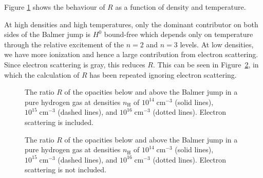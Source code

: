 \begin{problem}
Figure \ref{figure:problem-balmer-jump} shows the behaviour of $R$ as a function of density and temperature. 

At high densities and high temperatures, only the dominant contributor on both sides of the Balmer jump is $H^0$ bound-free which depends only on temperature through the relative excitement of the $n = 2$ and $n = 3$ levels. At low densities, we have more ionization and hence a large contribution from electron scattering. Since electron scattering is gray, this reduces $R$. This can be seen in Figure~\ref{figure:problem-balmer-jump-no-e}, in which the calculation of $R$ has been repeated ignoring electron scattering.

\begin{figure}
\footnotesize
{}
\caption{The ratio $R$ of the opacities below and above the Balmer jump in a pure hydrogen gas at densities $n_\mathrm{H}$ of $10^{14}\;\mathrm{cm^{-3}}$ (solid lines), $10^{15}\;\mathrm{cm^{-3}}$ (dashed lines), and $10^{16}\;\mathrm{cm^{-3}}$ (dotted lines). Electron scattering is included.}
\label{figure:problem-balmer-jump}
\end{figure}

\begin{figure}
\footnotesize
{}
\caption{The ratio $R$ of the opacities below and above the Balmer jump in a pure hydrogen gas at densities $n_\mathrm{H}$ of $10^{14}\;\mathrm{cm^{-3}}$ (solid lines), $10^{15}\;\mathrm{cm^{-3}}$ (dashed lines), and $10^{16}\;\mathrm{cm^{-3}}$ (dotted lines). Electron scattering is not included.}
\label{figure:problem-balmer-jump-no-e}
\end{figure}
\end{problem}

